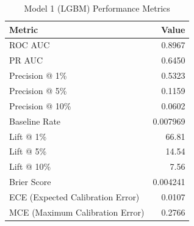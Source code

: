 \begin{table}[h]
\centering
\begin{tabular}{lr}
\toprule
Metric & Value \\
\midrule
ROC AUC & 0.8967 \\
PR AUC & 0.6450 \\
Precision @ 1\% & 0.5323 \\
Precision @ 5\% & 0.1159 \\
Precision @ 10\% & 0.0602 \\
Baseline Rate & 0.007969 \\
Lift @ 1\% & 66.81 \\
Lift @ 5\% & 14.54 \\
Lift @ 10\% & 7.56 \\
Brier Score & 0.004241 \\
ECE (Expected Calibration Error) & 0.0107 \\
MCE (Maximum Calibration Error) & 0.2766 \\
\bottomrule
\end{tabular}
\caption{Model 1 (LGBM) Performance Metrics}
\label{tab:model1_lgbm_metrics}
\end{table}
